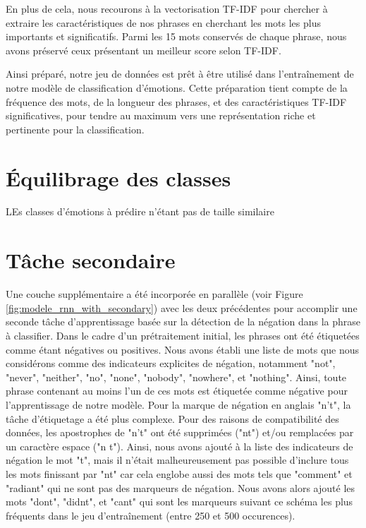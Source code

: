 \documentclass{article}
\begin{document}
En plus de cela, nous recourons à la vectorisation TF-IDF pour chercher à extraire les caractéristiques de nos phrases en cherchant les mots les plus importants et significatifs. 
Parmi les 15 mots conservés de chaque phrase, nous avons préservé ceux présentant un meilleur score selon TF-IDF. 

Ainsi préparé, notre jeu de données est prêt à être utilisé dans l'entraînement de notre modèle de classification d'émotions. Cette préparation tient compte de la fréquence des mots, de la longueur des phrases, et des caractéristiques TF-IDF significatives, pour tendre au maximum vers une représentation riche et pertinente pour la classification.

\section{Équilibrage des classes}
LEs classes d'émotions à prédire n'étant pas de taille similaire 

\section{Tâche secondaire}
Une couche supplémentaire a été incorporée en parallèle (voir Figure \ref{fig:modele_rnn_with_secondary}) avec les deux précédentes pour accomplir une seconde tâche d'apprentissage basée sur la détection de la négation dans la phrase à classifier. 
Dans le cadre d'un prétraitement initial, les phrases ont été étiquetées comme étant négatives ou positives. 
Nous avons établi une liste de mots que nous considérons comme des indicateurs explicites de négation, notamment "not", "never", "neither", "no", "none", "nobody", "nowhere", et "nothing". 
Ainsi, toute phrase contenant au moins l'un de ces mots est étiquetée comme négative pour l'apprentissage de notre modèle. Pour la marque de négation en anglais "n't", la tâche d'étiquetage a été plus complexe. 
Pour des raisons de compatibilité des données, les apostrophes de "n't" ont été supprimées ("nt") et/ou remplacées par un caractère espace ("n t"). 
Ainsi, nous avons ajouté à la liste des indicateurs de négation le mot "t", mais il n'était malheureusement pas possible d'inclure tous les mots finissant par "nt" car cela englobe aussi des mots tels que "comment" et "radiant" qui ne sont pas des marqueurs de négation. 
Nous avons alors ajouté les mots "dont", "didnt", et "cant" qui sont les marqueurs suivant ce schéma les plus fréquents dans le jeu d'entraînement (entre 250 et 500 occurences). 
\end{document}
